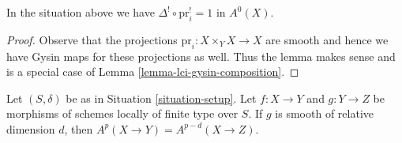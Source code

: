 \begin{lemma}
\label{lemma-diagonal-identity}
In the situation above we have $\Delta^! \circ \text{pr}_i^! = 1$ in $A^0(X)$.
\end{lemma}

\begin{proof}
Observe that the projections $\text{pr}_i : X \times_Y X \to X$ are
smooth and hence we have Gysin maps for these projections as well.
Thus the lemma makes sense and is a special case of
Lemma \ref{lemma-lci-gysin-composition}.
\end{proof}

\begin{proposition}
\label{proposition-compute-bivariant}
\begin{reference}
\cite[Proposition 17.4.2]{F}
\end{reference}
Let $(S, \delta)$ be as in Situation \ref{situation-setup}.
Let $f : X \to Y$ and $g : Y \to Z$ be morphisms of schemes locally
of finite type over $S$. If $g$ is smooth of relative dimension $d$, then
$A^p(X \to Y) = A^{p - d}(X \to Z)$.
\end{proposition}

